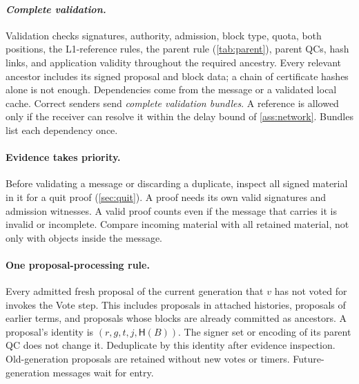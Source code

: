 \documentclass[11pt,a4paper]{article}
\newcommand{\Hash}{\mathsf H}
\newcommand{\defterm}[1]{\textcolor{rrBlue}{\textit{#1}}}
\begin{document}
\paragraph{\defterm{Complete validation.}}
Validation checks signatures, authority, admission, block type, quota,
both positions, the L1-reference rules, the parent rule
(\cref{tab:parent}), parent QCs, hash links, and application validity
throughout the required ancestry. Every relevant ancestor includes its
signed proposal and block data; a chain of certificate hashes alone is
not enough. Dependencies come from the message or a validated local
cache. Correct senders send \defterm{complete validation bundles}. A reference is
allowed only if the receiver can resolve it within the delay bound of
\cref{ass:network}. Bundles list each dependency once.

\paragraph{Evidence takes priority.}
Before validating a message or discarding a duplicate, inspect all signed
material in it for a quit proof (\cref{sec:quit}). A proof needs its own
valid signatures and admission witnesses. A valid proof counts even if
the message that carries it is invalid or incomplete. Compare incoming
material with all retained material, not only with objects inside the
message.

\paragraph{One proposal-processing rule.}
Every admitted fresh proposal of the current generation that $v$ has not
voted for invokes the Vote step. This includes proposals in attached
histories, proposals of earlier terms, and proposals whose blocks are
already committed as ancestors. A proposal's identity is
$(r,g,t,j,\Hash(B))$. The signer set or encoding of its parent QC does
not change it. Deduplicate by this identity after evidence inspection.
Old-generation proposals are retained without new votes or timers.
Future-generation messages wait for entry.
\end{document}
